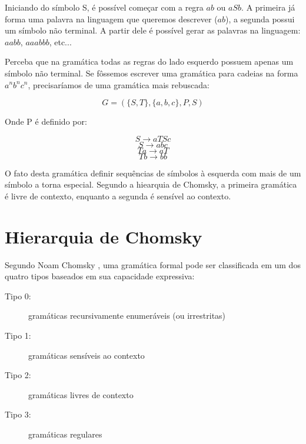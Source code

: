 \documentclass[a4paper,12pt,oneside,onecolumn]{uerj}
\begin{document}
Iniciando do símbolo S, é possível começar com a regra $ab$ ou $aSb$. A primeira já forma uma palavra na linguagem que queremos descrever ($ab$), a segunda possui um símbolo não terminal. A partir dele é possível gerar as palavras na linguagem: $aabb$, $aaabbb$, etc...

Perceba que na gramática todas as regras do lado esquerdo possuem apenas um símbolo não terminal. Se fôssemos escrever uma gramática para cadeias na forma $a^nb^nc^n$, precisaríamos de uma gramática mais rebuscada:

\begin{equation*}
	G = (\{S, T\}, \{a,b,c\}, P, S)
\end{equation*}

Onde P é definido por:

\begin{equation*}
	S \rightarrow aTSc
\end{equation*}
\begin{equation*}
	S \rightarrow abc
\end{equation*}
\begin{equation*}
	Ta \rightarrow aT
\end{equation*}
\begin{equation*}
	Tb \rightarrow bb
\end{equation*}

O fato desta gramática definir sequências de símbolos à esquerda com mais de um símbolo a torna especial. Segundo a hiearquia de Chomsky, a primeira gramática é livre de contexto, enquanto a segunda é sensível ao contexto.

\section{Hierarquia de Chomsky}

Segundo Noam Chomsky \cite{bib:Chomsky57}, uma gramática formal pode ser classificada em um dos quatro tipos baseados em sua capacidade expressiva:

\begin{description}
    \item[Tipo 0:] gramáticas recursivamente enumeráveis (ou irrestritas)
    \item[Tipo 1:] gramáticas sensíveis ao contexto
    \item[Tipo 2:] gramáticas livres de contexto
    \item[Tipo 3:] gramáticas regulares
\end{description}
\end{document}
